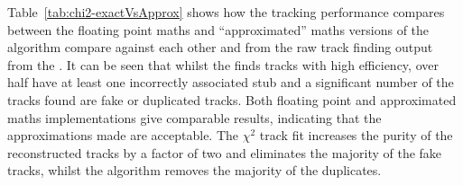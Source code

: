 \begin{table}[htbp]

\label{tab:chi2-exactVsApprox}
 \centering
\end{table}

Table~\ref{tab:chi2-exactVsApprox} shows how the tracking performance compares between the floating point maths and ``approximated'' maths versions of the algorithm compare against each other and from the raw track finding output from the \HT.
It can be seen that whilst the \HT finds tracks with high efficiency, over half have at least one incorrectly associated stub and a significant number of the tracks found are fake or duplicated tracks.
Both floating point and approximated maths implementations give comparable results, indicating that the approximations made are acceptable.
The $\chi^{2}$ track fit increases the purity of the reconstructed tracks by a factor of two and eliminates the majority of the fake tracks, whilst the \DR algorithm removes the majority of the duplicates.



